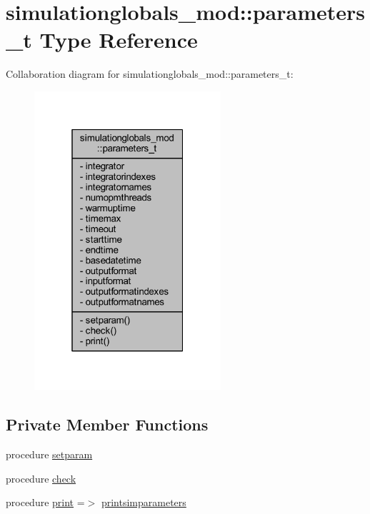 \hypertarget{structsimulationglobals__mod_1_1parameters__t}{}\section{simulationglobals\+\_\+mod\+:\+:parameters\+\_\+t Type Reference}
\label{structsimulationglobals__mod_1_1parameters__t}


Collaboration diagram for simulationglobals\+\_\+mod\+:\+:parameters\+\_\+t\+:\nopagebreak
\begin{figure}[H]
\begin{center}
\leavevmode
\includegraphics[width=196pt]{structsimulationglobals__mod_1_1parameters__t__coll__graph}
\end{center}
\end{figure}
\subsection*{Private Member Functions}
\begin{DoxyCompactItemize}
\item 
procedure \mbox{\hyperlink{structsimulationglobals__mod_1_1parameters__t_a247d15eba9f019e79c02b2be9a22ad86}{setparam}}
\item 
procedure \mbox{\hyperlink{structsimulationglobals__mod_1_1parameters__t_a7e20edb4525a73f679bd1175c9b9b399}{check}}
\item 
procedure \mbox{\hyperlink{structsimulationglobals__mod_1_1parameters__t_a3ffbed4e006d02030a0f863b5194d183}{print}} =$>$ \mbox{\hyperlink{namespacesimulationglobals__mod_ab67964fe7c3fb20a4ce0b4193520aa1d}{printsimparameters}}
\end{DoxyCompactItemize}
